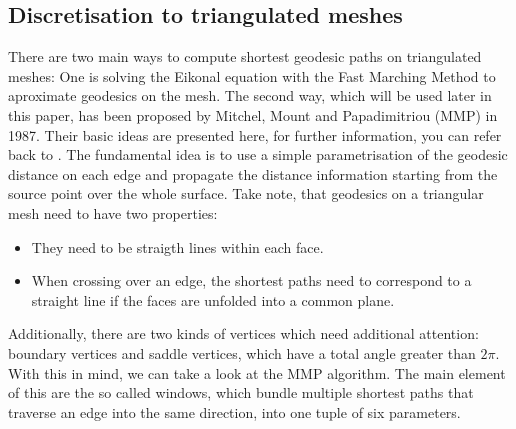 \subsection*{Discretisation to triangulated meshes}
There are two main ways to compute shortest geodesic paths on triangulated meshes: One is solving the Eikonal equation with the Fast Marching Method to aproximate geodesics on the mesh.
The second way, which will be used later in this paper, has been proposed by Mitchel, Mount and Papadimitriou (MMP) in 1987.
Their basic ideas are presented here, for further information, you can refer back to \cite{surazhsky2005fast}.
The fundamental idea is to use a simple parametrisation of the geodesic distance on each edge and propagate the distance information starting from the source point over the whole surface.
Take note, that geodesics on a triangular mesh need to have two properties:
\begin{itemize}
	\item They need to be straigth lines within each face.
	\item When crossing over an edge, the shortest paths need to correspond to a straight line if the faces are unfolded into a common plane.
\end{itemize}
Additionally, there are two kinds of vertices which need additional attention: boundary vertices and saddle vertices, which have a total angle greater than $2\pi$.
With this in mind, we can take a look at the MMP algorithm.
The main element of this are the so called windows, which bundle multiple shortest paths that traverse an edge into the same direction, into one tuple of six parameters.

